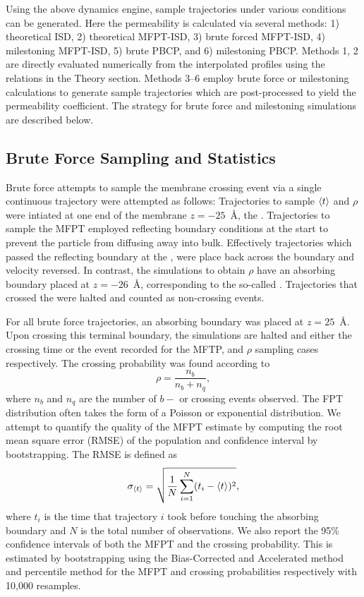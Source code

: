     \par Using the above dynamics engine, sample trajectories under various conditions can be generated. Here the permeability is calculated via several methods: 1) theoretical ISD, 2) theoretical MFPT-ISD, 3) brute forced MFPT-ISD, 4) milestoning MFPT-ISD, 5) brute PBCP, and 6) milestoning PBCP. Methods 1, 2 are directly evaluated numerically from the interpolated profiles using the relations in the Theory section. Methods 3--6 employ brute force or milestoning calculations to generate sample trajectories which are post-processed to yield the permeability coefficient. The strategy for brute force and milestoning simulations are described below.

    \subsection{Brute Force Sampling and Statistics}
        \par Brute force attempts to sample the membrane crossing event via a single continuous trajectory were attempted as follows: Trajectories to sample $\langle t\rangle$  and $\rho$ were intiated at one end of the membrane $z=-25$~\AA, the . Trajectories to sample the MFPT employed reflecting boundary conditions at the start to prevent the particle from diffusing away into bulk. Effectively trajectories which passed the reflecting boundary at the , were place back across the boundary and velocity reversed. In contrast, the simulations to obtain $\rho$ have an absorbing boundary placed at $z=-26$~\AA, corresponding to the so-called . Trajectories that crossed the  were halted and counted as non-crossing events.

        \par For all brute force trajectories, an absorbing boundary was placed at $z=25$~\AA. Upon crossing this terminal boundary, the simulations are halted and either the crossing time or the event recorded for the MFTP, and $\rho$ sampling cases respectively. The crossing probability was found according to
        \begin{equation}
            \rho = \frac{n_b}{n_b + n_q},
        \end{equation}
        where $n_b$ and $n_q$ are the number of $b-$ or  crossing events observed. The FPT distribution often takes the form of a Poisson or exponential distribution. We attempt to quantify the quality of the MFPT estimate by computing the root mean square error (RMSE) of the population and confidence interval by bootstrapping. The RMSE is defined as
        \begin{equation}
            \sigma_{\langle t\rangle} = \sqrt{\frac{1}{N}\sum_{i=1}^{N} (t_i - \langle t\rangle)^2},
        \end{equation}
        where $t_i$ is the time that trajectory $i$ took before touching the absorbing boundary and $N$ is the total number of observations. We also report the 95\% confidence intervals of both the MFPT and the crossing probability. This is estimated by bootstrapping using the Bias-Corrected and Accelerated method and percentile method for the MFPT and crossing probabilities respectively with 10,000 resamples\cite{Efron1987,Efron1993}.

